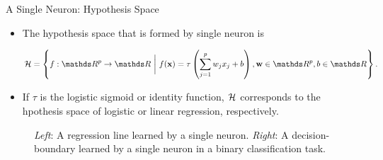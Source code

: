 \documentclass[11pt,compress,t,notes=noshow, xcolor=table]{beamer}
\begin{document}

\begin{vbframe}{A Single Neuron: Hypothesis Space}
\begin{itemize}
\item The hypothesis space that is formed by single neuron %
is 
\begin{small}
$$\Hspace  = \left\{f: \R^p \to \R ~\bigg|~ \fx = \tau\left(\sum_{j = 1}^p w_j x_j + b\right), \wtw \in \R^p, b \in \R\right\}.$$ 
\end{small}
\item If $\tau$ is the logistic sigmoid or identity function, $\mathcal{H}$ corresponds to the hpothesis space of logistic or linear regression, respectively.
\end{itemize}
\vspace*{-0.45cm}
\begin{figure}
\centering
{}
\vspace*{-0.2cm}
\begin{tiny}
\caption{\textit{Left}: A regression line learned by a single neuron. \textit{Right}: A decision-boundary learned by a single neuron in a binary classification task.}
\end{tiny}
\end{figure}
\end{vbframe}
\end{document}
